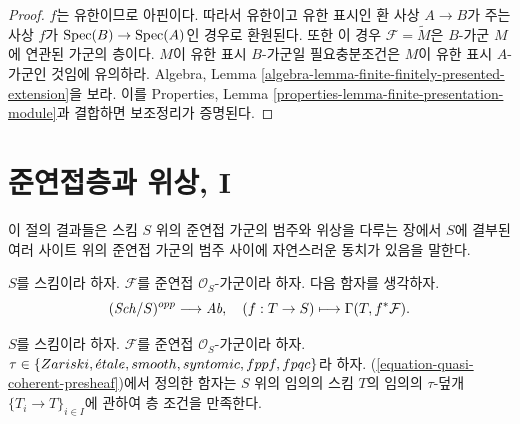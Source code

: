 \begin{proof}
$f$는 유한이므로 아핀이다. 따라서 유한이고 유한 표시인 환 사상
$A \to B$가 주는 사상 $f$가 $\mathop{\mathrm{Spec}}(B) \to \mathop{\mathrm{Spec}}(A)$인 경우로 환원된다.
또한 이 경우 $\mathcal{F} = \widetilde{M}$은 $B$-가군 $M$에 연관된 가군의
층이다. $M$이 유한 표시 $B$-가군일 필요충분조건은 $M$이 유한 표시
$A$-가군인 것임에 유의하라. Algebra, Lemma
\ref{algebra-lemma-finite-finitely-presented-extension}을 보라. 이를
Properties, Lemma \ref{properties-lemma-finite-presentation-module}과
결합하면 보조정리가 증명된다.
\end{proof}
















\section{준연접층과 위상, I}
\label{section-quasi-coherent-sheaves}

\noindent
이 절의 결과들은 스킴 $S$ 위의 준연접 가군의 범주와
위상을 다루는 장에서 $S$에 결부된 여러 사이트 위의
준연접 가군의 범주 사이에 자연스러운 동치가 있음을 말한다.

\medskip\noindent
$S$를 스킴이라 하자.
$\mathcal{F}$를 준연접 $\mathcal{O}_S$-가군이라 하자.
다음 함자를 생각하자.
\begin{equation}
\label{equation-quasi-coherent-presheaf}
(\mathit{Sch}/S)^{opp} \longrightarrow \textit{Ab},
\quad
(f : T \to S) \longmapsto \Gamma(T, f^*\mathcal{F}).
\end{equation}

\begin{lemma}
\label{lemma-sheaf-condition-holds}
$S$를 스킴이라 하자.
$\mathcal{F}$를 준연접 $\mathcal{O}_S$-가군이라 하자.
$\tau \in \{Zariski, \linebreak[0] \etale, \linebreak[0] smooth,
\linebreak[0] syntomic, \linebreak[0] fppf, \linebreak[0] fpqc\}$라 하자.
(\ref{equation-quasi-coherent-presheaf})에서 정의한 함자는 $S$ 위의
임의의 스킴 $T$의 임의의 $\tau$-덮개
$\{T_i \to T\}_{i \in I}$에 관하여 층 조건을 만족한다.
\end{lemma}

